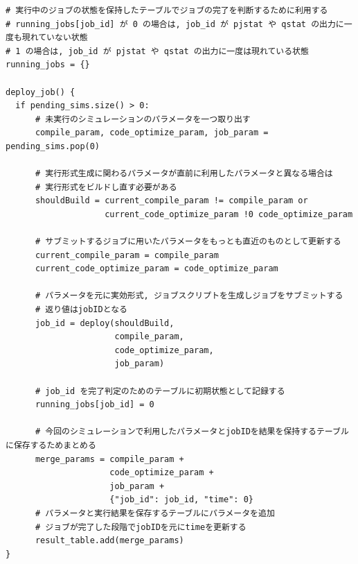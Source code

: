 {\footnotesize
\begin{lstlisting}[numbers=none, caption=ジョブサブミットの前後処理　疑似コード]
# 実行中のジョブの状態を保持したテーブルでジョブの完了を判断するために利用する
# running_jobs[job_id] が 0 の場合は, job_id が pjstat や qstat の出力に一度も現れていない状態
# 1 の場合は, job_id が pjstat や qstat の出力に一度は現れている状態
running_jobs = {}

deploy_job() {
  if pending_sims.size() > 0:
      # 未実行のシミュレーションのパラメータを一つ取り出す
      compile_param, code_optimize_param, job_param = pending_sims.pop(0)

      # 実行形式生成に関わるパラメータが直前に利用したパラメータと異なる場合は
      # 実行形式をビルドし直す必要がある
      shouldBuild = current_compile_param != compile_param or
                    current_code_optimize_param !0 code_optimize_param

      # サブミットするジョブに用いたパラメータをもっとも直近のものとして更新する
      current_compile_param = compile_param
      current_code_optimize_param = code_optimize_param

      # パラメータを元に実効形式, ジョブスクリプトを生成しジョブをサブミットする
      # 返り値はjobIDとなる
      job_id = deploy(shouldBuild,
                      compile_param,
                      code_optimize_param,
                      job_param)

      # job_id を完了判定のためのテーブルに初期状態として記録する
      running_jobs[job_id] = 0

      # 今回のシミュレーションで利用したパラメータとjobIDを結果を保持するテーブルに保存するためまとめる
      merge_params = compile_param +
                     code_optimize_param +
                     job_param +
                     {"job_id": job_id, "time": 0}
      # パラメータと実行結果を保存するテーブルにパラメータを追加
      # ジョブが完了した段階でjobIDを元にtimeを更新する
      result_table.add(merge_params)
}

\end{lstlisting}
}

